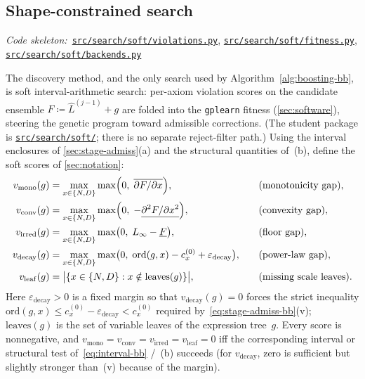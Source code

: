 \documentclass[11pt]{article}
\newcommand{\Lhat}{\hat{L}}
\newcommand{\repoBlob}{https://github.com/krichelj/ByteBoost-Shape-Constrained-Boosted-SR/blob/main/}
\newcommand{\repoTree}{https://github.com/krichelj/ByteBoost-Shape-Constrained-Boosted-SR/tree/main/}
\newcommand{\pyFile}[1]{\href{\repoBlob#1}{\nolinkurl{#1}}}
\newcommand{\pyDir}[1]{\href{\repoTree#1}{\nolinkurl{#1/}}}
\newcommand{\codeRef}[1]{%
  \par\nobreak\noindent
  {\footnotesize\textit{Code skeleton:}~#1}\par\smallskip}
\theoremstyle{plain}
\theoremstyle{remark}
\begin{document}
\subsection{Shape-constrained search}\label{sec:soft}
\codeRef{\pyFile{src/search/soft/violations.py}, \pyFile{src/search/soft/fitness.py}, \pyFile{src/search/soft/backends.py}}
The discovery method, and the only search used by Algorithm~\ref{alg:boosting-bb}, is soft interval-arithmetic search: per-axiom violation scores on the candidate ensemble $F \coloneqq \Lhat^{(j-1)}+g$ are folded into the \texttt{gplearn} fitness (\cref{sec:software}), steering the genetic program toward admissible corrections.
(The student package is \pyDir{src/search/soft}; there is no separate reject-filter path.)
Using the interval enclosures of \cref{sec:stage-admiss}(a) and the structural quantities of~(b), define the soft scores of \cref{sec:notation}:
\begin{equation}\label{eq:violations-bb}
\begin{aligned}
    v_{\mathrm{mono}}(g)
      &= \max_{x\in\{N,D\}}
         \max\Bigl(0,\; \overline{\partial F/\partial x}\Bigr),
    &\quad&\text{(monotonicity gap)},
    \\
    v_{\mathrm{conv}}(g)
      &= \max_{x\in\{N,D\}}
         \max\Bigl(0,\; -\underline{\partial^2 F/\partial x^2}\Bigr),
    &\quad&\text{(convexity gap)},
    \\
    v_{\mathrm{irred}}(g)
      &= \max_{x\in\{N,D\}}
         \max\bigl(0,\; L_\infty - \underline{F}\bigr),
    &\quad&\text{(floor gap)},
    \\
    v_{\mathrm{decay}}(g)
      &= \max_{x\in\{N,D\}}
         \max\bigl(0,\;
           \mathrm{ord}(g,x) - c_x^{(0)}
           + \varepsilon_{\mathrm{decay}}\bigr),
    &\quad&\text{(power-law gap)},
    \\
    v_{\mathrm{leaf}}(g)
      &= \bigl|\{x\in\{N,D\}
           : x \notin \mathrm{leaves}(g)\}\bigr|,
    &\quad&\text{(missing scale leaves)}.
\end{aligned}
\end{equation}
Here $\varepsilon_{\mathrm{decay}} > 0$ is a fixed margin so that $v_{\mathrm{decay}}(g)=0$ forces the strict inequality $\mathrm{ord}(g,x) \leq c_x^{(0)}-\varepsilon_{\mathrm{decay}} < c_x^{(0)}$ required by~\eqref{eq:stage-admiss-bb}(v); $\mathrm{leaves}(g)$ is the set of variable leaves of the expression tree~$g$.
Every score is nonnegative, and $v_{\mathrm{mono}}=v_{\mathrm{conv}}=v_{\mathrm{irred}}=v_{\mathrm{leaf}}=0$ iff the corresponding interval or structural test of~\eqref{eq:interval-bb} /~(b) succeeds (for $v_{\mathrm{decay}}$, zero is sufficient but slightly stronger than~(v) because of the margin).
\end{document}

